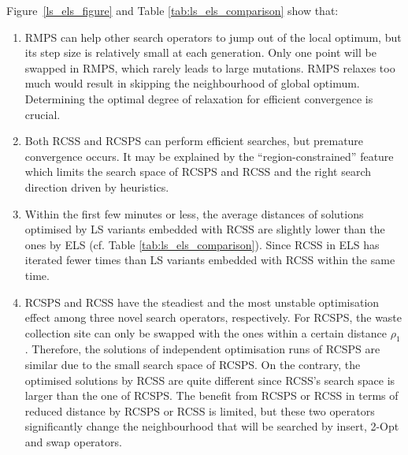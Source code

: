 \documentclass[journal]{IEEEtran}
\begin{document}
Figure~\ref{ls_els_figure} and Table \ref{tab:ls_els_comparison} show that:
\begin{enumerate}[label=(\roman*)]
	\item \label{ob_1} RMPS can help other search operators to jump out of the local optimum, but its step size is relatively small at each generation. Only one point will be swapped in RMPS, which rarely leads to large mutations.
    RMPS relaxes too much would result in skipping the neighbourhood of global optimum. Determining the optimal degree of relaxation for efficient convergence is crucial.
	\item \label{ob_2} Both RCSS and RCSPS can perform efficient searches, but premature convergence occurs. It may be explained by the ``region-constrained'' feature which limits the search space of RCSPS and RCSS and the right search direction driven by heuristics.
	\item \label{ob_3} Within the first few minutes or less, the average distances of solutions optimised by LS variants embedded with RCSS are slightly lower than the ones by ELS (cf. Table \ref{tab:ls_els_comparison}). Since RCSS in ELS has iterated fewer times than LS variants embedded with RCSS within the same time.
	\item \label{ob_4} RCSPS and RCSS have the steadiest and the most unstable optimisation effect among three novel search operators, respectively. For RCSPS, the waste collection site can only be swapped with the ones within a certain distance $\rho_1$. Therefore, the solutions of independent optimisation runs of RCSPS are similar due to the small search space of RCSPS. On the contrary, the optimised solutions by RCSS are quite different since RCSS's search space is larger than the one of RCSPS. The benefit from RCSPS or RCSS in terms of reduced distance by RCSPS or RCSS is limited, but these two operators significantly change the neighbourhood that will be searched by insert, 2-Opt and swap operators.
\end{enumerate}

\end{document}
